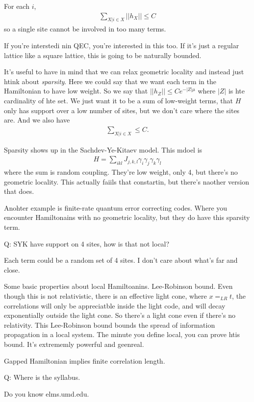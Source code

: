 For each $i$,
\begin{align}
    \sum_{X|i\in X} ||h_X|| \le C
\end{align}
so a single site cannot be involved in too many terms.

If you're interstedi nin  QEC, you're interested in this too.
If it's just a regular lattice like a square lattice, this is going to be
naturally bounded.

It's useful to have in mind that we can relax geometric locality and instead
just htink about \emph{sparsity}.
Here we could say that we want each term in the Hamiltonian to have low weight.
So we say that $||h_Z||\le Ce^{-|Z|\mu}$ where $|Z|$ is hte cardinality of hte
set.
We just want it to be a sum of low-weight terms,
that $H$ only has support over a low number of sites,
but we don't care where the sites are.
And we also have
\begin{align}
    \sum_{X|i\in X} \le C.
\end{align}

Sparsity shows up in the Sachdev-Ye-Kitaev model.
This mdoel is
\begin{align}
    H = \sum_{ikl} J_{j,k,l} \gamma_i\gamma_j\gamma_k\gamma_l
\end{align}
where the sum is random coupling.
They're low weight, only 4, but there's no geometric locality.
This actually faiils that constartin, but there's naother version that does.


Anohter example is finite-rate quantum error correcting codes.
Where you encounter Hamiltonains with no geometric locality,
but they do have this sparsity term.

Q: SYK have support on 4 sites, how is that not local?

Each term could be a random set of 4 sites.
I don't care about what's far and close.

Some basic properties about local Hamiltoanins.
Lee-Robinson bound.
Even though this is not relativistic,
there is an effective light cone, where $x=_{LR} t$,
the correlations will only be appreciatble inside the light code,
and will decay exponentially outside the light cone.
So there's a light cone even if there's no relativity.
This Lee-Robinson bound bounds the spread of information propagation in a local
system.
The minute you define local, you can prove htis bound.
It's extrememly powerful and geenreal.

Gapped Hamiltonian implies finite correlation length.

Q: Where is the syllabus.

Do you know elms.umd.edu.
